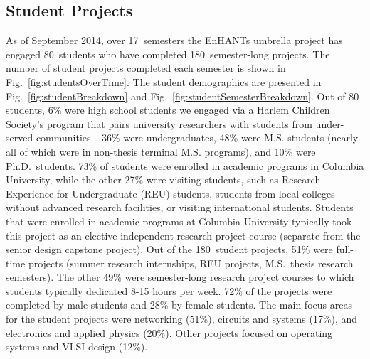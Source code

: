 \documentclass[journal,twopages]{IEEEtran}
\newcommand{\makered}[1]{\color{black}#1\color{black}}
\begin{document}
\iffalse
We initially used off-the-shelf components, including MICA2 motes\footnote{The current EnHANT prototype only uses the mote's \emph{microcontroller}. The initial hardware integration efforts resulted in many devices being damaged. Therefore, we decided to use MICA2 motes, of which we had an over-supply in an outdated sensor network testbed.}; throughout the different phases, nearly all the off-the-shelf components were replaced with custom-designed ones. At the end of each development phase, we fully integrated the phase's prototype and testbed components (as indicated in Fig.~\ref{fig:Phases}), and demonstrated a fully functional system. This approach necessitates continuous interaction between the designers and developers of different components and algorithms, and ensures that the integration challenges are addressed quickly.
\fi






 
\subsection{Student Projects} \label{sect:StudentProjects}



As of September 2014, over 17~semesters the EnHANTs umbrella project has engaged 80~students who have completed 180~semester-long projects.
The number of student projects completed each semester is shown in Fig.~\ref{fig:studentsOverTime}. The student demographics are presented
in Fig.~\ref{fig:studentBreakdown} and Fig.~\ref{fig:studentSemesterBreakdown}.
Out of 80 students, 6\% were high school students we engaged via a Harlem Children Society's program that pairs university researchers with students from under-served communities~\cite{HarlemChildrenSociety}. 36\% were undergraduates, 48\% were M.S. students (nearly all of which were in non-thesis terminal M.S. programs), and 10\% were Ph.D.~students. 73\% of students were enrolled in academic programs in Columbia University, while the other 27\% were visiting students, such as Research Experience for Undergraduate (REU) students, students from local colleges without advanced research facilities, or visiting international students. \makered{Students that were enrolled in academic programs at Columbia University typically took this project as an elective independent research project course (separate from the senior design capstone project)}.
Out of the 180~student projects, 51\% were full-time projects (summer research internships, REU projects, M.S.\ thesis research semesters).
The other 49\% were semester-long research project courses to which students typically dedicated 8-15 hours per week. 72\% of the projects were completed by male students and 28\% by female students. The main focus areas for the student projects were networking (51\%), circuits and systems (17\%), and electronics and applied physics (20\%). Other projects focused on operating systems and VLSI design (12\%).
\end{document}
